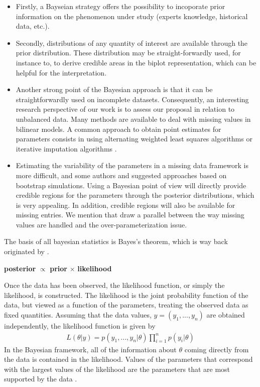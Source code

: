 \begin{itemize}	
\item Firstly, a Bayseian strategy offers the possibility to incoporate prior information on the phenomenon under study (experts knowledge, historical data, etc.). 

\item Secondly, distributions of any quantity of interest are available through the prior distribution. These distribution may be straight-forwardly used, for instance to, to derive credible areas in the biplot representation, which can be helpful for the interpretation.
\item Another strong point of the Bayesian approach is that it can be straightforwardly used
on incomplete datasets. Consequently, an interesting research perspective of our work is to
assess our proposal in relation to unbalanced data. Many methods are available to deal with
missing values in bilinear models. A common approach to obtain point estimates
for parameters consists in using alternating weighted least squares algorithms or iterative
imputation algorithms \citep{Gabriel1979, Kiers1997, Gauch1990}. 

\item Estimating the variability of the parameters in a missing data framework
is more difficult, and some authors \citet{Adams2002} and \citet{Josse2011} suggested
approaches based on bootstrap simulations. Using a Bayesian point of view will directly
provide credible regions for the parameters through the posterior distributions, which is
very appealing. In addition, credible regions will also be available for missing entries. We
mention that  draw a parallel between the way missing values are
handled and the over-parameterization issue.
\end{itemize}
The basis of all bayesian statistics is Bayes's theorem, which is way back originated by \citep{Bayes1763}.
             \begin{center}
	       \textbf{posterior} $\varpropto$ \textbf{prior} $\times$ \textbf{likelihood}
               \end{center}

Once the data has been observed, the likelihood function, or simply the
likelihood, is constructed. The likelihood is the joint probability function of the
data, but viewed as a function of the parameters, treating the observed data as
fixed quantities. Assuming that the data values, $y= (y_1,...,y_n)$ are obtained
independently, the likelihood function is given by
\begin{eqnarray}
L(\theta|y)=p(y_1,..., y_n|\theta)\prod_{i=1}^{n} p(y_i|\theta) \nonumber
\end{eqnarray}
In the Bayesian framework, all of the information about $\theta$ coming directly from
the data is contained in the likelihood. Values of the parameters that correspond
with the largest values of the likelihood are the parameters that are most supported
by the data \citep{Glickman2007}.

